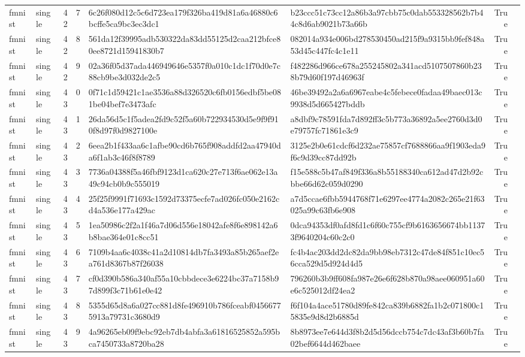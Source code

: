 \begin{tabular}{llrrllrl}
fmnist & single & 42 & 7 & 6c26f080d12c5c6d723ea179f326ba419d81a6a46880c6bcffe5ca9bc3ec3dc1 & b23ccc51c73cc12a86b3a97cbb75c0dab553328562b7b44c8d6ab9021b73a66b & True &  \\
fmnist & single & 42 & 8 & 561da12f39995adb530322da83dd55125d2caa212bfce80ee8721d15941830b7 & 082014a934e006bd278530450ad215f9a9315bb9fef848a53d45c447fc4c1e11 & True &  \\
fmnist & single & 42 & 9 & 02a36f05d37ada446949646e5357f0a010c1dc1f70d0e7c88cb9be3d032de2c5 & f482286d966ce678a255245802a341acd5107507860b238b79d60f197d46963f & True &  \\
fmnist & single & 43 & 0 & 0f71c1d59421c1ae3536a88d326520c6fb0156edbf5be081be04bef7e3473afc & 46be39492a2a6a6967eabe4c5febece0fadaa49baec013c9938d5d665427bddb & True &  \\
fmnist & single & 43 & 1 & 26da56d5c1f5adea2fd9c52f5a60b722934530d5e9f9f910f8d97f0d9827100e & a8dbf9c78591fda7d892ff3c5b773a36892a5ee2760d3d0e79757fc71861e3c9 & True &  \\
fmnist & single & 43 & 2 & 6eea2b1f433aa6c1afbe90cd6b765f908addfd2aa47940da6f1ab3c46f8f8789 & 3125e2b0e61cdcf6d232ae75857cf7688866aa9f1903eda9f6c9d39cc87dd92b & True &  \\
fmnist & single & 43 & 3 & 7736a04388f5a46fbf9123d1ca620c27e713f6ae062e13a49c94cb0b9c555019 & f15e588c5b47af849f336a8b55188340ca612ad47d2b92cbbe66d62c059d0290 & True &  \\
fmnist & single & 43 & 4 & 25f25f9991f71693c1592d73375ecfe7ad026fc050e2162cd4a536e177a429ac & a7d5ccae6fbb5944768f71e6297ee4774a2082c265e21f63025a99c63fb6e908 & True &  \\
fmnist & single & 43 & 5 & 1ea50986c2f2a1f46a7d06d556e18042afe8f6e898142a6b8bae364e01c8cc51 & 0dca94353df0afd8fd1c6f60c755cf9b6163656674bb11373f9640204c60c2c0 & True &  \\
fmnist & single & 43 & 6 & 7109b4aa6c4038c41a2d10814db7fa3493a85b265aef2ea761d8367b87f26038 & fc4b4ac203dd2dc82da9bb98eb7312c47de84f851c10ec56cca529d5d924d4d5 & True &  \\
fmnist & single & 43 & 7 & cf0d390b586a340af55a10cbbdece3e6224bc37a7158b97d899f3c71b61e0e42 & 796260b3b9ff608fa987e26e6f628b870a98aee060951a60e6c525012df24ea2 & True &  \\
fmnist & single & 43 & 8 & 5355d65d8a6a027cc881d8fe496910b786fceabf04566775913a79731c3680d9 & f6f104a4ace51780d89fe842ca839b6882fa1b2c071800c15835e9d8d2b6885d & True &  \\
fmnist & single & 43 & 9 & 4a96265eb09f9ebc92eb7db4abfa3a61816525852a595bca7450733a8720ba28 & 8b8973ee7e644d3f8b2d5d56dccb754c7dc43af3b60b7fa02bef6644d462baee & True &  \\

\end{tabular}
